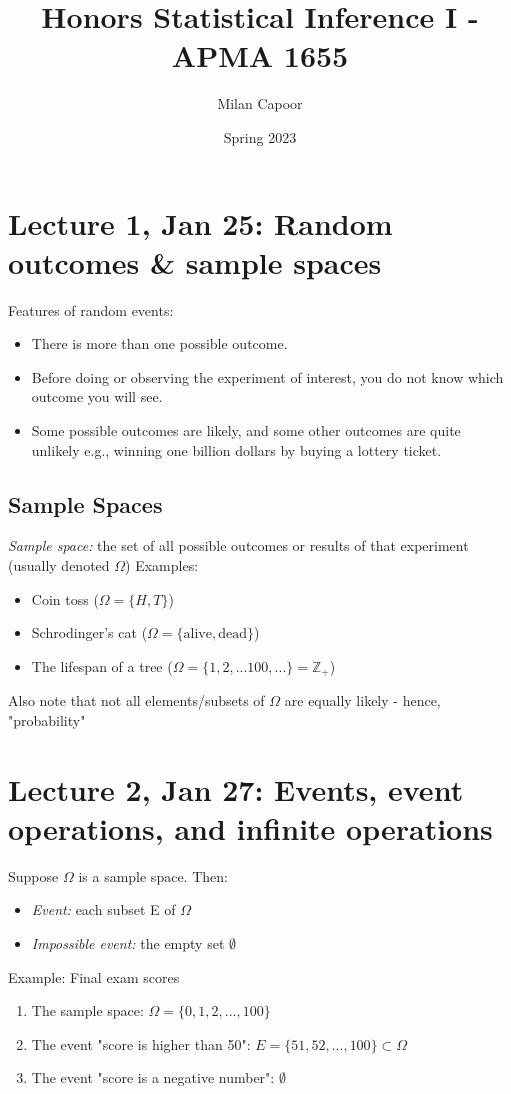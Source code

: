 \documentclass[12pt]{article}
\title{Honors Statistical Inference I - APMA 1655}
\author{Milan Capoor}
\date{Spring 2023}
\begin{document}
\maketitle
\section{Lecture 1, Jan 25: Random outcomes \& sample spaces}
Features of random events:
\begin{itemize}
    \item There is more than one possible outcome.
    \item Before doing or observing the experiment of interest, you do not know which outcome you will see. \item Some possible outcomes are likely, and some other outcomes are quite unlikely e.g., winning one billion dollars by buying a lottery ticket.
\end{itemize}

\subsection*{Sample Spaces}
\emph{Sample space:} the set of all possible outcomes or results of that experiment (usually denoted $\Omega$)
Examples:
\begin{itemize}
    \item Coin toss ($\Omega = \{H, T\}$)
    \item Schrodinger's cat ($\Omega = \{\text{alive}, \text{dead}\}$)
    \item The lifespan of a tree ($\Omega = \{1, 2, ... 100, ...\} = \mathbb{Z}_+$)
\end{itemize}

Also note that not all elements/subsets of $\Omega$ are equally likely - hence, "probability"

\section{Lecture 2, Jan 27: Events, event operations, and infinite operations}
Suppose $\Omega$ is a sample space. Then:
\begin{itemize}
    \item \emph{Event:} each subset E of $\Omega$
    \item \emph{Impossible event:} the empty set $\emptyset$
\end{itemize}

Example: Final exam scores
\begin{enumerate}
    \item The sample space: $\Omega = \{0, 1, 2, ..., 100\}$
    \item The event "score is higher than 50": $E = \{51, 52, ..., 100\} \subset \Omega$
    \item The event "score is a negative number": $\emptyset$ 
\end{enumerate}
\end{document}
